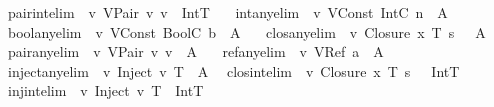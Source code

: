 \begin{isabellebody}
\ \ pair{\isacharunderscore}int{\isacharbrackleft}elim{\isacharbang}{\isacharbrackright}{\isacharcolon}\ {\isachardoublequoteopen}{\isasymSigma}\ {\isasymturnstile}v\ {\isacharparenleft}VPair\ v{}\ v{}{\isacharparenright}\ {\isacharcolon}\ IntT{\isachardoublequoteclose}\ \isanewline
\ \ int{\isacharunderscore}any{\isacharbrackleft}elim{\isacharbang}{\isacharbrackright}{\isacharcolon}\ {\isachardoublequoteopen}{\isasymSigma}\ {\isasymturnstile}v\ {\isacharparenleft}VConst\ {\isacharparenleft}IntC\ n{\isacharparenright}{\isacharparenright}\ {\isacharcolon}\ A{\isachardoublequoteclose}\ \isanewline
\ \ bool{\isacharunderscore}any{\isacharbrackleft}elim{\isacharbang}{\isacharbrackright}{\isacharcolon}\ {\isachardoublequoteopen}{\isasymSigma}\ {\isasymturnstile}v\ {\isacharparenleft}VConst\ {\isacharparenleft}BoolC\ b{\isacharparenright}{\isacharparenright}\ {\isacharcolon}\ A{\isachardoublequoteclose}\ \isanewline
\ \ clos{\isacharunderscore}any{\isacharbrackleft}elim{\isacharbang}{\isacharbrackright}{\isacharcolon}\ {\isachardoublequoteopen}{\isasymSigma}\ {\isasymturnstile}v\ {\isacharparenleft}Closure\ x\ T\ s\ {\isasymrho}{\isacharparenright}\ {\isacharcolon}\ A{\isachardoublequoteclose}\ \isanewline
\ \ pair{\isacharunderscore}any{\isacharbrackleft}elim{\isacharbang}{\isacharbrackright}{\isacharcolon}\ {\isachardoublequoteopen}{\isasymSigma}\ {\isasymturnstile}v\ {\isacharparenleft}VPair\ v{}\ v{}{\isacharparenright}\ {\isacharcolon}\ A{\isachardoublequoteclose}\ \isanewline
\ \ ref{\isacharunderscore}any{\isacharbrackleft}elim{\isacharbang}{\isacharbrackright}{\isacharcolon}\ {\isachardoublequoteopen}{\isasymSigma}\ {\isasymturnstile}v\ {\isacharparenleft}VRef\ a{\isacharparenright}\ {\isacharcolon}\ A{\isachardoublequoteclose}\ \isanewline
\ \ inject{\isacharunderscore}any{\isacharbrackleft}elim{\isacharbang}{\isacharbrackright}{\isacharcolon}\ {\isachardoublequoteopen}{\isasymSigma}\ {\isasymturnstile}v\ {\isacharparenleft}Inject\ v\ T{\isacharparenright}\ {\isacharcolon}\ A{\isachardoublequoteclose}\isanewline
\isanewline
{}\isamarkupfalse \isanewline
\ \ clos{\isacharunderscore}int{\isacharbrackleft}elim{\isacharbang}{\isacharbrackright}{\isacharcolon}\ {\isachardoublequoteopen}{\isasymSigma}\ {\isasymturnstile}v\ {\isacharparenleft}Closure\ x\ T\ s\ {\isasymrho}{\isacharparenright}\ {\isacharcolon}\ IntT\ {\isachardoublequoteclose}\ \isanewline
\ \ inj{\isacharunderscore}int{\isacharbrackleft}elim{\isacharbang}{\isacharbrackright}{\isacharcolon}\ {\isachardoublequoteopen}{\isasymSigma}\ {\isasymturnstile}v\ {\isacharparenleft}Inject\ v\ T{\isacharparenright}\ {\isacharcolon}\ IntT\ {\isachardoublequoteclose}\ \isanewline

\end{isabellebody}
